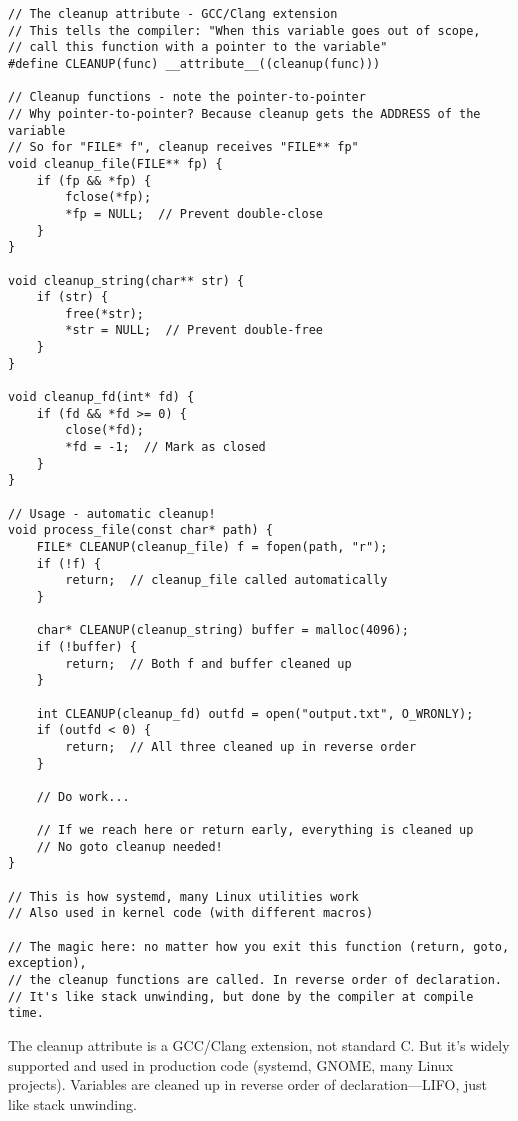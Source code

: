 \begin{lstlisting}
// The cleanup attribute - GCC/Clang extension
// This tells the compiler: "When this variable goes out of scope,
// call this function with a pointer to the variable"
#define CLEANUP(func) __attribute__((cleanup(func)))

// Cleanup functions - note the pointer-to-pointer
// Why pointer-to-pointer? Because cleanup gets the ADDRESS of the variable
// So for "FILE* f", cleanup receives "FILE** fp"
void cleanup_file(FILE** fp) {
    if (fp && *fp) {
        fclose(*fp);
        *fp = NULL;  // Prevent double-close
    }
}

void cleanup_string(char** str) {
    if (str) {
        free(*str);
        *str = NULL;  // Prevent double-free
    }
}

void cleanup_fd(int* fd) {
    if (fd && *fd >= 0) {
        close(*fd);
        *fd = -1;  // Mark as closed
    }
}

// Usage - automatic cleanup!
void process_file(const char* path) {
    FILE* CLEANUP(cleanup_file) f = fopen(path, "r");
    if (!f) {
        return;  // cleanup_file called automatically
    }

    char* CLEANUP(cleanup_string) buffer = malloc(4096);
    if (!buffer) {
        return;  // Both f and buffer cleaned up
    }

    int CLEANUP(cleanup_fd) outfd = open("output.txt", O_WRONLY);
    if (outfd < 0) {
        return;  // All three cleaned up in reverse order
    }

    // Do work...

    // If we reach here or return early, everything is cleaned up
    // No goto cleanup needed!
}

// This is how systemd, many Linux utilities work
// Also used in kernel code (with different macros)

// The magic here: no matter how you exit this function (return, goto, exception),
// the cleanup functions are called. In reverse order of declaration.
// It's like stack unwinding, but done by the compiler at compile time.
\end{lstlisting}

\begin{notebox}
The cleanup attribute is a GCC/Clang extension, not standard C. But it's widely supported and used in production code (systemd, GNOME, many Linux projects). Variables are cleaned up in reverse order of declaration---LIFO, just like stack unwinding.
\end{notebox}


